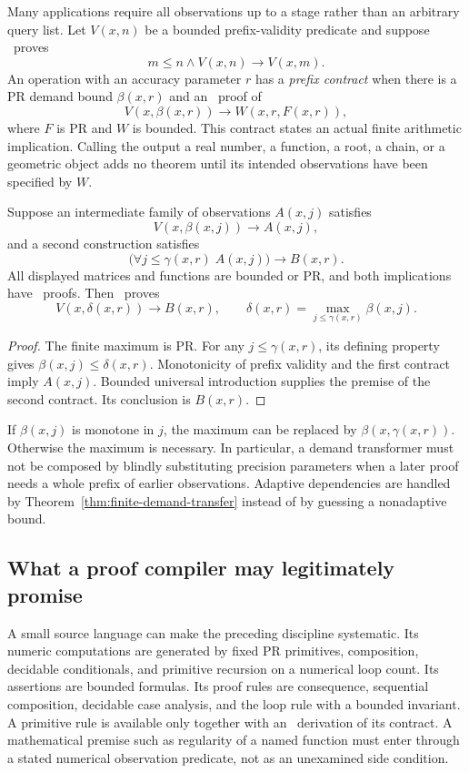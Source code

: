 Many applications require all observations up to a stage rather than an
arbitrary query list.  Let $V(x,n)$ be a bounded prefix-validity predicate and
suppose \ipra\ proves
\[
 m\le n\land V(x,n)\longrightarrow V(x,m).
\]
An operation with an accuracy parameter $r$ has a \emph{prefix contract} when
there is a PR demand bound $\beta(x,r)$ and an \ipra\ proof of
\[
 V(x,\beta(x,r))\longrightarrow W(x,r,F(x,r)),
\]
where $F$ is PR and $W$ is bounded.  This contract states an actual finite
arithmetic implication.  Calling the output a real number, a function, a
root, a chain, or a geometric object adds no theorem until its intended
observations have been specified by $W$.

\begin{proposition}
\label{prop:prefix-composition}
Suppose an intermediate family of observations $A(x,j)$ satisfies
\[
 V(x,\beta(x,j))\longrightarrow A(x,j),
\]
and a second construction satisfies
\[
 \bigl(\forall j\le\gamma(x,r)\;A(x,j)\bigr)
       \longrightarrow B(x,r).
\]
All displayed matrices and functions are bounded or PR, and both implications
have \ipra\ proofs.  Then \ipra\ proves
\[
 V(x,\delta(x,r))\longrightarrow B(x,r),\qquad
 \delta(x,r)=\max_{j\le\gamma(x,r)}\beta(x,j).
\]
\end{proposition}

\begin{proof}
The finite maximum is PR.  For any $j\le\gamma(x,r)$, its defining property
gives $\beta(x,j)\le\delta(x,r)$.  Monotonicity of prefix validity and the
first contract imply $A(x,j)$.  Bounded universal introduction supplies the
premise of the second contract.  Its conclusion is $B(x,r)$.
\end{proof}

If $\beta(x,j)$ is monotone in $j$, the maximum can be replaced by
$\beta(x,\gamma(x,r))$.  Otherwise the maximum is necessary.  In particular,
a demand transformer must not be composed by blindly substituting precision
parameters when a later proof needs a whole prefix of earlier observations.
Adaptive dependencies are handled by Theorem~\ref{thm:finite-demand-transfer}
instead of by guessing a nonadaptive bound.

\subsection{What a proof compiler may legitimately promise}
\label{sec:proof-compiler}

A small source language can make the preceding discipline systematic.  Its
numeric computations are generated by fixed PR primitives, composition,
decidable conditionals, and primitive recursion on a numerical loop count.
Its assertions are bounded formulas.  Its proof rules are consequence,
sequential composition, decidable case analysis, and the loop rule with a
bounded invariant.  A primitive rule is available only together with an
\ipra\ derivation of its contract.  A mathematical premise such as regularity
of a named function must enter through a stated numerical observation
predicate, not as an unexamined side condition.

